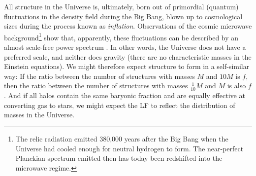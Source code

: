 \documentclass[useAMS]{aa}
\begin{document}
All structure in the Universe is, ultimately, born out of primordial (quantum) fluctuations in the density field during the Big Bang, blown up to cosmological sizes during the process known as \emph{inflation}.
Observations of the cosmic microwave background\footnote{The relic radiation emitted 380,000 years after the Big Bang when the Universe had cooled enough for neutral hydrogen to form. The near-perfect Planckian spectrum emitted then has today been redshifted into the microwave regime.} show that, apparently, these fluctuations can be described by an almost scale-free power spectrum \citep{PlanckCollaboration2020}.
In other words, the Universe does not have a preferred scale, and neither does gravity (there are no characteristic masses in the Einstein equations).
We might therefore expect structure to form in a self-similar way: If the ratio between the number of structures with masses $M$ and $10M$ is $f$, then the ratio between the number of structures with masses $\frac{1}{10}M$ and $M$ is also $f$.
And if all halos contain the same baryonic fraction and are equally effective at converting gas to stars, we might expect the LF to reflect the distribution of masses in the Universe.
\end{document}
